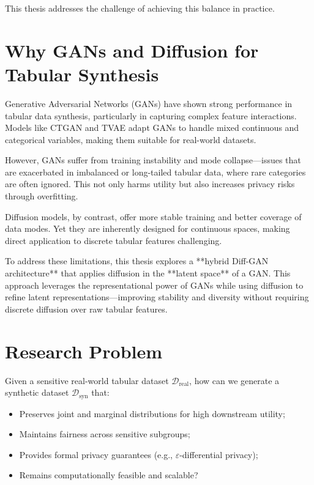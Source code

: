This thesis addresses the challenge of achieving this balance in practice.

\section{Why GANs and Diffusion for Tabular Synthesis}
\label{sec:gan_diffusion_motivation}

Generative Adversarial Networks (GANs) have shown strong performance in tabular data synthesis, particularly in capturing complex feature interactions. Models like CTGAN and TVAE adapt GANs to handle mixed continuous and categorical variables, making them suitable for real-world datasets.

However, GANs suffer from training instability and mode collapse—issues that are exacerbated in imbalanced or long-tailed tabular data, where rare categories are often ignored. This not only harms utility but also increases privacy risks through overfitting.

Diffusion models, by contrast, offer more stable training and better coverage of data modes. Yet they are inherently designed for continuous spaces, making direct application to discrete tabular features challenging.

To address these limitations, this thesis explores a **hybrid Diff-GAN architecture** that applies diffusion in the **latent space** of a GAN. This approach leverages the representational power of GANs while using diffusion to refine latent representations—improving stability and diversity without requiring discrete diffusion over raw tabular features.

\section{Research Problem}
\label{sec:research_problem}

Given a sensitive real-world tabular dataset $\mathcal{D}_{\text{real}}$, how can we generate a synthetic dataset $\mathcal{D}_{\text{syn}}$ that:
\begin{itemize}
    \item Preserves joint and marginal distributions for high downstream utility;
    \item Maintains fairness across sensitive subgroups;
    \item Provides formal privacy guarantees (e.g., $\varepsilon$-differential privacy);
    \item Remains computationally feasible and scalable?
\end{itemize}

